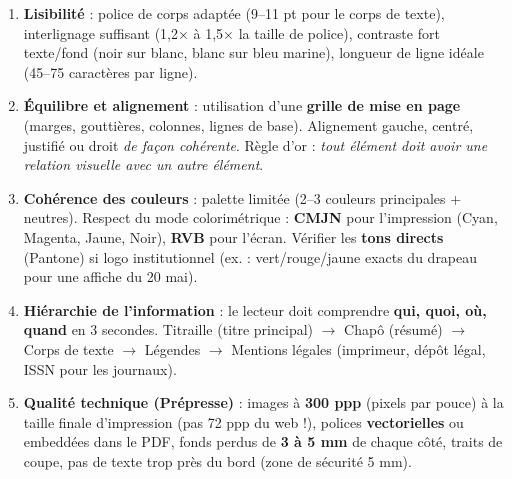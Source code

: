 \documentclass[11pt]{article}
\begin{document}
\begin{aretenir}
\begin{enumerate}
    \item \textbf{Lisibilité} : police de corps adaptée (9–11 pt pour le corps de texte), interlignage suffisant (1,2× à 1,5× la taille de police), contraste fort texte/fond (noir sur blanc, blanc sur bleu marine), longueur de ligne idéale (45–75 caractères par ligne).
    \item \textbf{Équilibre et alignement} : utilisation d'une \textbf{grille de mise en page} (marges, gouttières, colonnes, lignes de base). Alignement gauche, centré, justifié ou droit \emph{de façon cohérente}. Règle d'or : \emph{tout élément doit avoir une relation visuelle avec un autre élément}.
    \item \textbf{Cohérence des couleurs} : palette limitée (2–3 couleurs principales + neutres). Respect du mode colorimétrique : \textbf{CMJN} pour l'impression (Cyan, Magenta, Jaune, Noir), \textbf{RVB} pour l'écran. Vérifier les \textbf{tons directs} (Pantone) si logo institutionnel (ex. : vert/rouge/jaune exacts du drapeau pour une affiche du 20 mai).
    \item \textbf{Hiérarchie de l'information} : le lecteur doit comprendre \textbf{qui, quoi, où, quand} en 3 secondes. Titraille (titre principal) $\rightarrow$ Chapô (résumé) $\rightarrow$ Corps de texte $\rightarrow$ Légendes $\rightarrow$ Mentions légales (imprimeur, dépôt légal, ISSN pour les journaux).
    \item \textbf{Qualité technique (Prépresse)} : images à \textbf{300 ppp} (pixels par pouce) à la taille finale d'impression (pas 72 ppp du web !), polices \textbf{vectorielles} ou embeddées dans le PDF, fonds perdus de \textbf{3 à 5 mm} de chaque côté, traits de coupe, pas de texte trop près du bord (zone de sécurité 5 mm).
\end{enumerate}
\end{aretenir}
\end{document}
